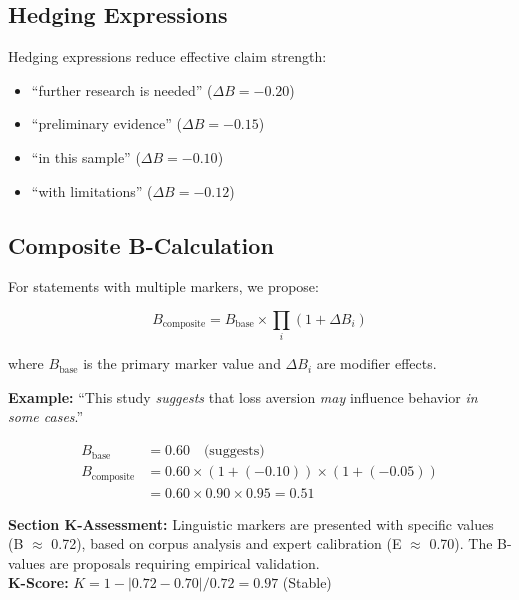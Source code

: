 \documentclass[11pt,a4paper]{article}
\begin{document}
\subsection{Hedging Expressions}

Hedging expressions reduce effective claim strength:

\begin{itemize}
    \item ``further research is needed'' ($\Delta B = -0.20$)
    \item ``preliminary evidence'' ($\Delta B = -0.15$)
    \item ``in this sample'' ($\Delta B = -0.10$)
    \item ``with limitations'' ($\Delta B = -0.12$)
\end{itemize}

\subsection{Composite B-Calculation}

For statements with multiple markers, we propose:

\begin{equation}
B_{\text{composite}} = B_{\text{base}} \times \prod_i (1 + \Delta B_i)
\end{equation}

where $B_{\text{base}}$ is the primary marker value and $\Delta B_i$
are modifier effects.

\textbf{Example:} ``This study \textit{suggests} that loss aversion
\textit{may} influence behavior \textit{in some cases}.''

\begin{align}
B_{\text{base}} &= 0.60 \quad \text{(suggests)} \nonumber \\
B_{\text{composite}} &= 0.60 \times (1 + (-0.10)) \times (1 + (-0.05)) \nonumber \\
&= 0.60 \times 0.90 \times 0.95 = 0.51
\end{align}

\begin{eslbox}
\textbf{Section K-Assessment:} Linguistic markers are presented with
specific values (B $\approx$ 0.72), based on corpus analysis and expert
calibration (E $\approx$ 0.70). The B-values are proposals requiring
empirical validation. \\
\textbf{K-Score:} $K = 1 - |0.72 - 0.70| / 0.72 = 0.97$ (Stable)
\end{eslbox}
\end{document}
